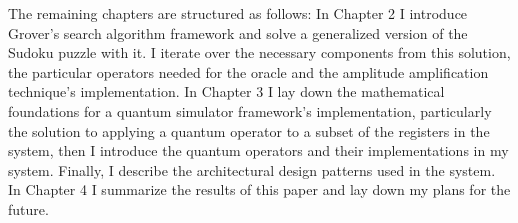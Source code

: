 The remaining chapters are structured as follows: In Chapter 2 I introduce Grover's search algorithm framework and solve a generalized version of the Sudoku puzzle with it. I iterate over the necessary components from this solution, the particular operators needed for the oracle and the amplitude amplification technique's implementation. In Chapter 3 I lay down the mathematical foundations for a quantum simulator framework's implementation, particularly the solution to applying a quantum operator to a subset of the registers in the system, then I introduce the quantum operators and their implementations in my system. Finally, I describe the architectural design patterns used in the system. In Chapter 4 I summarize the results of this paper and lay down my plans for the future.